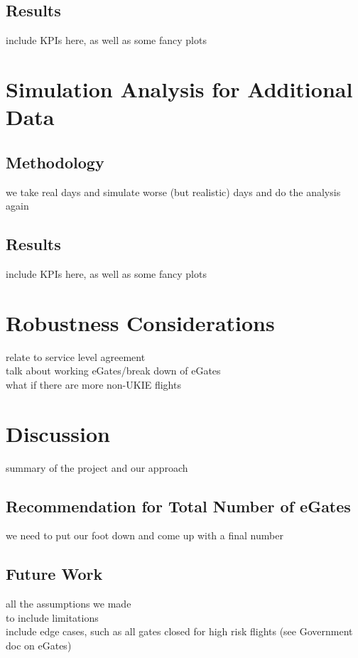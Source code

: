 \documentclass[10pt]{article}
\begin{document}
\subsection{Results}
include KPIs here, as well as some fancy plots


\section{Simulation Analysis for Additional Data}

\subsection{Methodology}
we take real days and simulate worse (but realistic) days and do the analysis again

\subsection{Results}
include KPIs here, as well as some fancy plots


\section{Robustness Considerations}
relate to service level agreement \\
talk about working eGates/break down of eGates  \\
what if there are more non-UKIE flights 

\section{Discussion}
summary of the project and our approach


\subsection{Recommendation for Total Number of eGates}
we need to put our foot down and come up with a final number

\subsection{Future Work}
all the assumptions we made \\
to include limitations \\
include edge cases, such as all gates closed for high risk flights (see Government doc on eGates) 


\end{document}
